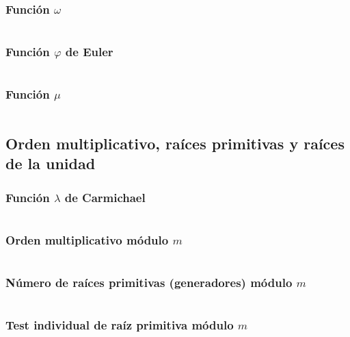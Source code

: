 \documentclass[11pt]{article}
\begin{document}
			\subsubsection{Función $\omega$}
			\inputminted[tabsize=2,breaklines,firstline=237,lastline=244,fontsize=\small]{c++}{numberTheory.cpp}
			
			\subsubsection{Función $\varphi$ de Euler}
			\inputminted[tabsize=2,breaklines,firstline=251,lastline=258,fontsize=\small]{c++}{numberTheory.cpp}
			
			\subsubsection{Función $\mu$}
			\inputminted[tabsize=2,breaklines,firstline=276,lastline=287,fontsize=\small]{c++}{numberTheory.cpp}
			
		\subsection{Orden multiplicativo, raíces primitivas y raíces de la unidad}
			\subsubsection{Función $\lambda$ de Carmichael}
			\inputminted[tabsize=2,breaklines,firstline=260,lastline=274,fontsize=\small]{c++}{numberTheory.cpp}
			
			\subsubsection{Orden multiplicativo módulo $m$}
			\inputminted[tabsize=2,breaklines,firstline=289,lastline=302,fontsize=\small]{c++}{numberTheory.cpp}
			
			\subsubsection{Número de raíces primitivas (generadores) módulo $m$}
			\inputminted[tabsize=2,breaklines,firstline=307,lastline=313,fontsize=\small]{c++}{numberTheory.cpp}
			
			\subsubsection{Test individual de raíz primitiva módulo $m$}
			\inputminted[tabsize=2,breaklines,firstline=315,lastline=325,fontsize=\small]{c++}{numberTheory.cpp}
			
\end{document}

